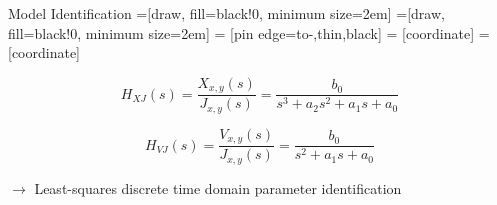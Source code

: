 \begin{frame}{Model Identification}
=[draw, fill=black!0, minimum size=2em]
=[draw, fill=black!0, minimum size=2em]
 = [pin edge={to-,thin,black}]
 = [coordinate]
 = [coordinate]

\begin{figure}
    \centering
    \label{fig:ideal_cont_model}
\end{figure}
    
    \vspace{4mm}
    
    \begin{equation*}
    H_{XJ}(s) = \frac{X_{x,y}(s)}{J_{x,y}(s)} = \frac{b_0}{s^3 + a_2 s^2 + a_1 s + a_0}
    \label{eq:pos_tf_3dorder}
    \end{equation*}

    \begin{equation*}
    H_{VJ}(s) = \frac{V_{x,y}(s)}{J_{x,y}(s)} = \frac{b_0}{s^2 + a_1 s + a_0}
    \label{eq:vel_tf_2ndorder}
    \end{equation*}
    
    \vspace{4mm}
    $\rightarrow$ Least-squares discrete time domain parameter identification
    
\end{frame}

